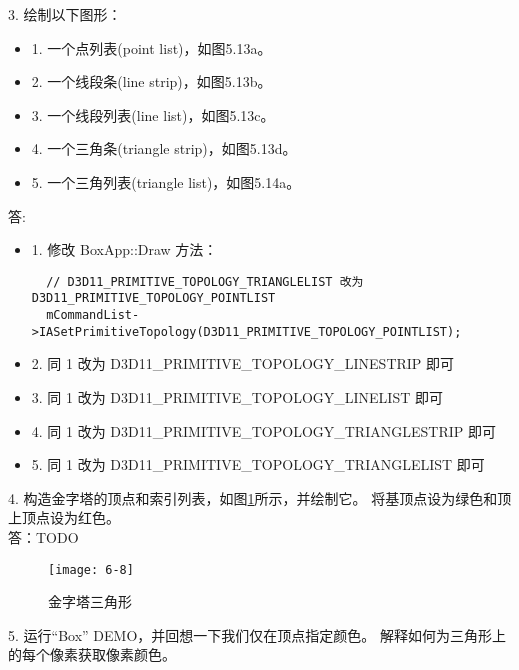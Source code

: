 \begin{flushleft}
3. 绘制以下图形：\\
\begin{itemize}
  \item 1. 一个点列表(point list)，如图5.13a。
  \item 2. 一个线段条(line strip)，如图5.13b。
  \item 3. 一个线段列表(line list)，如图5.13c。
  \item 4. 一个三角条(triangle strip)，如图5.13d。
  \item 5. 一个三角列表(triangle list)，如图5.14a。
\end{itemize}
答: \\
\begin{itemize}
  \item 1. 修改 BoxApp::Draw 方法：\\
  \begin{lstlisting}
  // D3D11_PRIMITIVE_TOPOLOGY_TRIANGLELIST 改为 D3D11_PRIMITIVE_TOPOLOGY_POINTLIST
  mCommandList->IASetPrimitiveTopology(D3D11_PRIMITIVE_TOPOLOGY_POINTLIST);
  \end{lstlisting}
  \item 2. 同 1 改为 D3D11\_PRIMITIVE\_TOPOLOGY\_LINESTRIP 即可
  \item 3. 同 1 改为 D3D11\_PRIMITIVE\_TOPOLOGY\_LINELIST 即可
  \item 4. 同 1 改为 D3D11\_PRIMITIVE\_TOPOLOGY\_TRIANGLESTRIP 即可
  \item 5. 同 1 改为 D3D11\_PRIMITIVE\_TOPOLOGY\_TRIANGLELIST 即可
\end{itemize}

\end{flushleft}

\begin{flushleft}
4. 构造金字塔的顶点和索引列表，如图\ref{fig:6-8}所示，并绘制它。 将基顶点设为绿色和顶上顶点设为红色。\\
答：TODO
\end{flushleft}
\begin{figure}[h]
    \texttt{[image: 6-8]}
    \centering
    \caption{金字塔三角形}
    \label{fig:6-8}
\end{figure}
\begin{flushleft}
5. 运行“Box” DEMO，并回想一下我们仅在顶点指定颜色。 解释如何为三角形上的每个像素获取像素颜色。
\end{flushleft}

